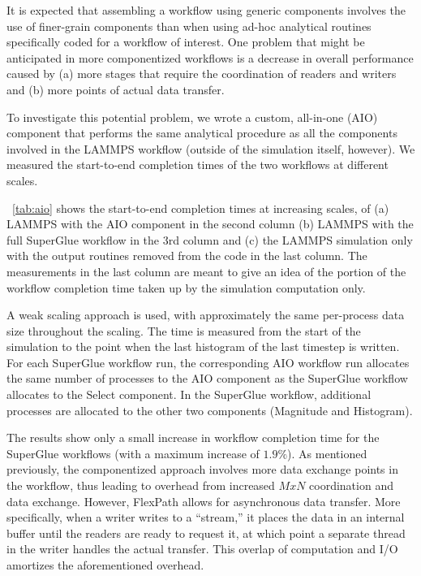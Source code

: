It is expected that assembling a workflow
using generic components involves the use
of finer-grain components
than when using ad-hoc analytical routines
specifically coded
for a workflow of interest.
One problem that might be anticipated
in more componentized workflows
is a decrease in overall performance caused by
(a) more stages that require the coordination
of readers and writers
and (b) more points of actual data transfer.

To investigate this potential problem,
we wrote a custom, all-in-one (AIO) component
that performs the same analytical procedure
as all the components involved in the LAMMPS workflow
(outside of the simulation itself, however).
We measured
the start-to-end completion times of the two workflows 
at different scales.

~\autoref{tab:aio} shows the start-to-end
completion times
at increasing scales, of
(a) LAMMPS with the AIO component
in the second column
(b) LAMMPS with the full SuperGlue workflow in the 3rd column
and (c) the LAMMPS simulation only with the output routines
removed from the code in the last column.
The measurements in the last column
are meant to give an idea of the portion
of the workflow completion time taken up by the simulation
computation only.

A weak scaling approach
is used, with approximately the same
per-process data size throughout the scaling.
The time is measured from the start of the simulation
to the point when the last histogram of
the last timestep is written.
For each SuperGlue workflow run, the corresponding
AIO workflow run allocates the same
number of processes to the AIO component
as the SuperGlue workflow allocates to the Select component.
In the SuperGlue workflow, additional processes
are allocated to the other two components
(Magnitude and Histogram).

The results show only a small increase in
workflow completion time for the SuperGlue
workflows (with a maximum increase of $1.9 \%$).
As mentioned previously, the componentized
approach involves more data exchange points
in the workflow, thus leading to
overhead from increased $MxN$ coordination and data exchange.
However, FlexPath allows
for asynchronous data transfer.
More specifically, when a writer writes to
a ``stream,'' it places
the data in an internal buffer
until the readers are ready to request it,
at which point a separate thread in the writer
handles the actual transfer.
This overlap
of computation and I/O
amortizes the aforementioned overhead.

